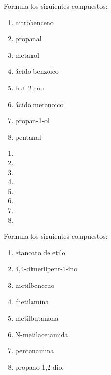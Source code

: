 \begin{exercise}[
    tags    = {orgánica,nomenclatura,múltiple,2B},
    topics  = {química orgánica,formulación,nomenclatura},
    source  = {Química 2B SAN 2016, p392, e23},
  ]
  Formula los siguientes compuestos:

  \begin{enumerate}
    \item nitrobenceno
    \item propanal
    \item metanol
    \item ácido benzoico
    \item but-2-eno
    \item ácido metanoico
    \item propan-1-ol
    \item pentanal
  \end{enumerate}
\end{exercise}

\begin{solution}
  \begin{enumerate}
    \item {}
    \item {}
    \item {}
    \item {}
    \item {}
    \item {}
    \item {}
    \item {}
  \end{enumerate}
\end{solution}



\begin{exercise}[
    tags    = {orgánica,nomenclatura,múltiple,2B},
    topics  = {química orgánica,formulación,nomenclatura},
    source  = {Química 2B SAN 2016, p392, e24},
  ]
  Formula los siguientes compuestos:

  \begin{enumerate}
    \item etanoato de etilo
    \item 3,4-dimetilpent-1-ino
    \item metilbenceno
    \item dietilamina
    \item metilbutanona
    \item N-metilacetamida
    \item pentanamina
    \item propano-1,2-diol
  \end{enumerate}
\end{exercise}

